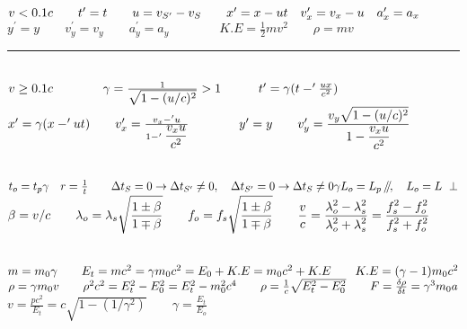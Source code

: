 \documentclass[a4paper,12pt]{article}
\newcommand{\slparallel}{\mathbin{\!/\mkern-5mu/\!}}
\begin{document}

\fontsize{14.5}{16}\selectfont

\noindent
$v < 0.1c \qquad t^\prime = t \qquad u = v_{S^\prime} - v_S \qquad x^\prime = x - ut \quad v^\prime_x = v_x - u \quad a_x^\prime = a_x \\[+2mm]$
$ y^\prime = y \qquad v^\prime_y = v_y \qquad a_y^\prime = a_y \qquad \qquad K.E = \frac{1}{2} mv^2 \qquad \rho = mv $

{\centering \rule{10cm}{0.4pt} \par}

\ \\
\noindent
$ v \ge 0.1c \qquad \qquad \gamma = \frac{1}{\displaystyle \sqrt{1- (u/c)^2}} > 1 \qquad \quad t^\prime = \gamma (t -^\prime \frac{ux}{c^2})\\$
$x^\prime = \gamma(x -^\prime ut) \qquad v^\prime_x = \frac{v_x -^\prime u}{1-^\prime \displaystyle \frac{v_x u}{c^2} } \qquad \qquad  y^\prime = y \qquad v^\prime_y = \displaystyle \frac{\displaystyle v_y \sqrt{1-(u/c)^2}}{\displaystyle 1- \frac{v_x u}{c^2}}\\[-3mm]$

{\centering \hdashrule{10cm}{0.4pt}{4pt} \par}

\ \\
\noindent
$ t_o = t_p \gamma \quad r = \frac{1}{t} \qquad \Delta t_S = 0 \rightarrow \Delta t_{S^\prime} \neq 0, \quad \Delta t_{S^\prime} = 0 \rightarrow \Delta t_S \neq 0 \\ \gamma L_o = L_p \ \slparallel, \quad L_o = L \ \perp \\[+2mm]$
$ \beta = v/c \qquad \lambda_o = \lambda_s \displaystyle \sqrt{\frac{1\pm \beta}{1\mp \beta}} \qquad f_o = f_s \displaystyle \sqrt{\frac{1\pm \beta}{1\mp \beta}} \qquad \frac{v}{c} = \frac{\displaystyle \lambda_o^2 - \lambda_s^2}{\displaystyle \lambda_o^2 + \lambda_s^2} = \frac{\displaystyle f_s^2 - f_o^2}{\displaystyle f_s^2 + f_o^2} \\[-1mm]$

{\centering \hdashrule{10cm}{0.4pt}{4pt} \par}

\ \\
\noindent
$ m = m_0 \gamma \qquad E_t = mc^2 = \gamma m_0c^2 = E_0 + K.E = m_0c^2 + K.E \qquad K.E = (\gamma - 1) m_0c^2 \\[+2mm]$
$\rho = \gamma m_0v \qquad \rho^2c^2 = E_t^2 - E_0^2 = E_t^2 - m_0^2c^4 \qquad \rho = \frac{1}{c} \sqrt{E_t^2 - E_0^2} \qquad F = \frac{\delta \rho}{\delta t} = \gamma^3 m_0 a\\[+2mm]$
$v = \frac{p c^2}{E_t} = c \sqrt{1- (1/\gamma^2)} \qquad \gamma = \frac{E_t}{E_o}$
\end{document}
